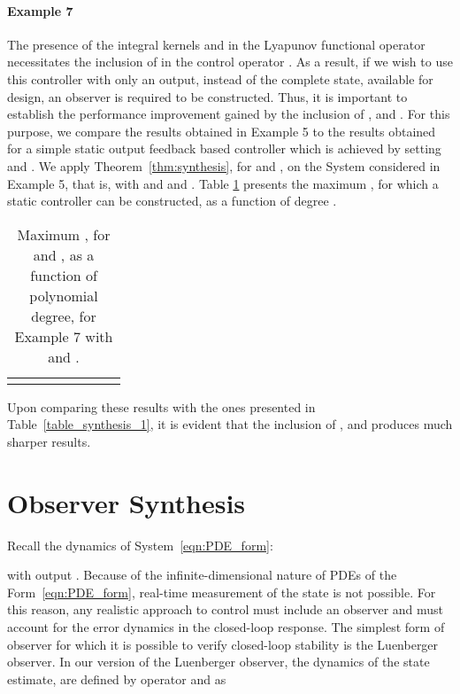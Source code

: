 \documentclass[9pt,journal,twocolumn]{IEEEtran}
\begin{document}
\paragraph*{Example 7} The presence of the integral kernels  and  in the Lyapunov functional operator  necessitates the inclusion of  in the control operator . As a result, if we wish to use this controller with only an output, instead of the complete state, available for design, an observer is required to be constructed. Thus, it is important to establish the performance improvement gained by the inclusion of ,  and . For this purpose, we compare the results obtained in Example 5 to the results obtained for a simple static output feedback based controller which is achieved by setting  and . We apply Theorem~\ref{thm:synthesis}, for  and , on the System considered in Example 5, that is, with  and  and . Table \ref{table_synthesis_3} presents the maximum  , for which a static controller can be constructed, as a function of degree .
\begin{table}[h]
\begin{center}
    \begin{tabular}{l *{7}{c}}\hline \hline
  &  &  &  &  \\ \hline
 &   &  &  &  \\
\end{tabular}
\end{center}
\caption{Maximum , for  and , as a function of polynomial degree,  for Example 7 with  and .}
\label{table_synthesis_3}
\end{table} Upon comparing these results with the ones presented in Table~\ref{table_synthesis_1}, it is evident that the inclusion of ,  and  produces much sharper results.



\section{Observer Synthesis}\label{obsynth}
Recall the dynamics of System~\eqref{eqn:PDE_form}:

with output . Because of the infinite-dimensional nature of PDEs of the Form~\eqref{eqn:PDE_form}, real-time measurement of the state is not possible. For this reason, any realistic approach to control must include an observer and must account for the error dynamics in the closed-loop response. The simplest form of observer for which it is possible to verify closed-loop stability is the Luenberger observer. In our version of the Luenberger observer, the dynamics of the state estimate,  are defined by operator  and  as
\end{document}
